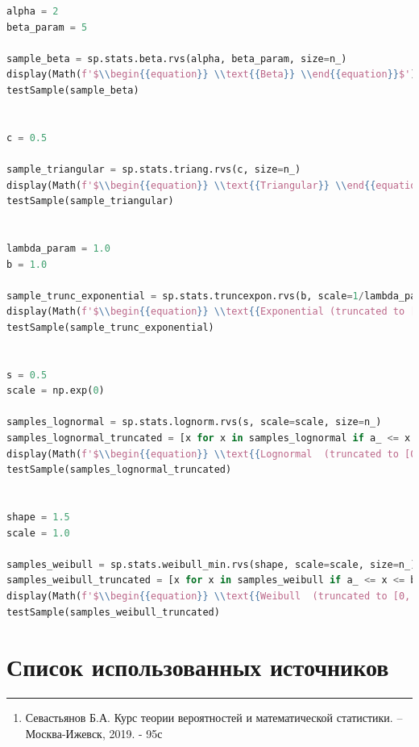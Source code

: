 \documentclass[a4paper, 14pt]{extarticle}
\begin{document}
\begin{center}
\begin{lstlisting}[language=Python]
alpha = 2
beta_param = 5

sample_beta = sp.stats.beta.rvs(alpha, beta_param, size=n_)
display(Math(f'$\\begin{{equation}} \\text{{Beta}} \\end{{equation}}$'))
testSample(sample_beta)


c = 0.5

sample_triangular = sp.stats.triang.rvs(c, size=n_)
display(Math(f'$\\begin{{equation}} \\text{{Triangular}} \\end{{equation}}$'))
testSample(sample_triangular)


lambda_param = 1.0
b = 1.0 

sample_trunc_exponential = sp.stats.truncexpon.rvs(b, scale=1/lambda_param, size=n_)
display(Math(f'$\\begin{{equation}} \\text{{Exponential (truncated to [0, 1])}} \\end{{equation}}$'))
testSample(sample_trunc_exponential)


s = 0.5 
scale = np.exp(0) 

samples_lognormal = sp.stats.lognorm.rvs(s, scale=scale, size=n_)
samples_lognormal_truncated = [x for x in samples_lognormal if a_ <= x <= b_]
display(Math(f'$\\begin{{equation}} \\text{{Lognormal  (truncated to [0, 1])}} \\end{{equation}}$'))
testSample(samples_lognormal_truncated)


shape = 1.5
scale = 1.0

samples_weibull = sp.stats.weibull_min.rvs(shape, scale=scale, size=n_)
samples_weibull_truncated = [x for x in samples_weibull if a_ <= x <= b_]
display(Math(f'$\\begin{{equation}} \\text{{Weibull  (truncated to [0, 1])}} \\end{{equation}}$'))
testSample(samples_weibull_truncated)
  \end{lstlisting}
\end{center}

\newpage

\section*{Список использованных источников}\vspace{-20pt}\rule{\linewidth}{0.1mm}

\begin{enumerate}
  \item Севастьянов Б.А. Курс теории вероятностей и математической статистики. --Москва-Ижевск, 2019. - 95с
\end{enumerate}
\end{document}
